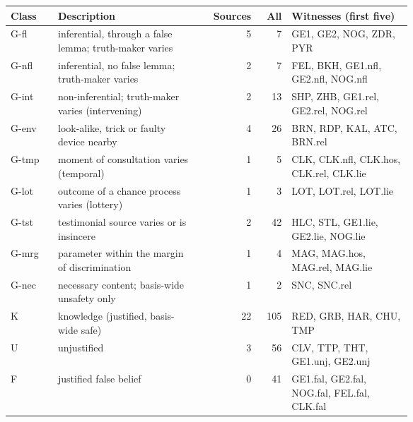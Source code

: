 \begin{center}\small
\begin{tabular}{@{}lp{0.36\linewidth}rrp{0.3\linewidth}@{}}\toprule
Class & Description & Sources & All & Witnesses (first five) \\ \midrule
G-fl & inferential, through a false lemma; truth-maker varies & 5 & 7 & GE1, GE2, NOG, ZDR, PYR \\
G-nfl & inferential, no false lemma; truth-maker varies & 2 & 7 & FEL, BKH, GE1.nfl, GE2.nfl, NOG.nfl \\
G-int & non-inferential; truth-maker varies (intervening) & 2 & 13 & SHP, ZHB, GE1.rel, GE2.rel, NOG.rel \\
G-env & look-alike, trick or faulty device nearby & 4 & 26 & BRN, RDP, KAL, ATC, BRN.rel \\
G-tmp & moment of consultation varies (temporal) & 1 & 5 & CLK, CLK.nfl, CLK.hos, CLK.rel, CLK.lie \\
G-lot & outcome of a chance process varies (lottery) & 1 & 3 & LOT, LOT.rel, LOT.lie \\
G-tst & testimonial source varies or is insincere & 2 & 42 & HLC, STL, GE1.lie, GE2.lie, NOG.lie \\
G-mrg & parameter within the margin of discrimination & 1 & 4 & MAG, MAG.hos, MAG.rel, MAG.lie \\
G-nec & necessary content; basis-wide unsafety only & 1 & 2 & SNC, SNC.rel \\
K & knowledge (justified, basis-wide safe) & 22 & 105 & RED, GRB, HAR, CHU, TMP \\
U & unjustified & 3 & 56 & CLV, TTP, THT, GE1.unj, GE2.unj \\
F & justified false belief & 0 & 41 & GE1.fal, GE2.fal, NOG.fal, FEL.fal, CLK.fal \\
\bottomrule\end{tabular}\end{center}
